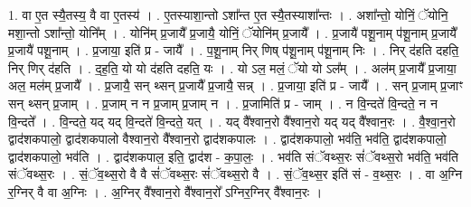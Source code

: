 \documentclass[17pt]{extarticle}
\begin{document}
1. वा ए॒त स्यै॒तस्य॒ वै वा ए॒तस्य॑ । . ए॒तस्याशा॒न्तो ऽशा᳚न्त ए॒त स्यै॒तस्याशा᳚न्तः । . अशा᳚न्तो॒ योनिं॒ ॅयोनि॒ मशा॒न्तो ऽशा᳚न्तो॒ योनि᳚म् । . योनि॑म् प्र॒जायै᳚ प्र॒जायै॒ योनिं॒ ॅयोनि॑म् प्र॒जायै᳚ । . प्र॒जायै॑ पशू॒नाम् प॑शू॒नाम् प्र॒जायै᳚ प्र॒जायै॑ पशू॒नाम् । . प्र॒जाया॒ इति॑ प्र - जायै᳚ । . प॒शू॒नाम् निर् णिष् प॑शू॒नाम् प॑शू॒नाम् निः । . निर् द॑हति दहति॒ निर् णिर् द॑हति । . द॒ह॒ति॒ यो यो द॑हति दहति॒ यः । . यो ऽल॒ मलं॒ ॅयो यो ऽल᳚म् । . अल॑म् प्र॒जायै᳚ प्र॒जाया॒ अल॒ मल॑म् प्र॒जायै᳚ । . प्र॒जायै॒ सन् थ्सन् प्र॒जायै᳚ प्र॒जायै॒ सन्न् । . प्र॒जाया॒ इति॑ प्र - जायै᳚ । . सन् प्र॒जाम् प्र॒जाꣳ सन् थ्सन् प्र॒जाम् । . प्र॒जाम् न न प्र॒जाम् प्र॒जाम् न । . प्र॒जामिति॑ प्र - जाम् । . न वि॒न्दते॑ वि॒न्दते॒ न न वि॒न्दते᳚ । . वि॒न्दते॒ यद् यद् वि॒न्दते॑ वि॒न्दते॒ यत् । . यद् वै᳚श्वान॒रो वै᳚श्वान॒रो यद् यद् वै᳚श्वान॒रः । . वै॒श्वा॒न॒रो द्वाद॑शकपालो॒ द्वाद॑शकपालो वैश्वान॒रो वै᳚श्वान॒रो द्वाद॑शकपालः । . द्वाद॑शकपालो॒ भव॑ति॒ भव॑ति॒ द्वाद॑शकपालो॒ द्वाद॑शकपालो॒ भव॑ति । . द्वाद॑शकपाल॒ इति॒ द्वाद॑श - क॒पा॒लः॒ । . भव॑ति संॅवथ्स॒रः सं॑ॅवथ्स॒रो भव॑ति॒ भव॑ति संॅवथ्स॒रः । . सं॒ॅव॒थ्स॒रो वै वै सं॑ॅवथ्स॒रः सं॑ॅवथ्स॒रो वै । . सं॒ॅव॒थ्स॒र इति॑ सं - व॒थ्स॒रः । . वा अ॒ग्नि र॒ग्निर् वै वा अ॒ग्निः । . अ॒ग्निर् वै᳚श्वान॒रो वै᳚श्वान॒रो᳚ ऽग्निर॒ग्निर् वै᳚श्वान॒रः । \newline
\end{document}
